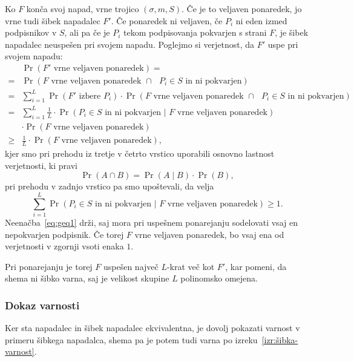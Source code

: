 \begin{dokaz}
    Ko $F$ konča svoj napad, vrne trojico $(\sigma, m, S)$. Če je to veljaven ponaredek, jo vrne tudi
    šibek napadalec $F'$. Če ponaredek ni veljaven, če $P_i$ ni eden izmed podpisnikov v $S$, ali pa
    če je $P_i$ tekom podpisovanja pokvarjen s strani $F$, je šibek napadalec neuspešen pri svojem napadu.
    Poglejmo si verjetnost, da $F'$ uspe pri svojem napadu:
    \begin{align*}
          &\Pr(\text{$F'$ vrne veljaven ponaredek}) = \\
        = &\Pr(\text{$F$ vrne veljaven ponaredek } \cap \text{ $P_i \in S$ in ni pokvarjen}) \\
        = &\sum_{i=1}^L \Pr(\text{$F'$ izbere $P_i$}) \cdot 
            \Pr(\text{$F$ vrne veljaven ponaredek } \cap \text{ $P_i \in S$ in ni pokvarjen}) \\
        = &\sum_{i=1}^L \frac{1}{L} \cdot 
            \Pr(\text{$P_i \in S$ in ni pokvarjen | $F$ vrne veljaven ponaredek}) \\
          &\cdot \Pr(\text{$F$ vrne veljaven ponaredek}) \\
        \geq &\frac{1}{L} \cdot \Pr(\text{$F$ vrne veljaven ponaredek}),
    \end{align*}
    kjer smo pri prehodu iz tretje v četrto vrstico uporabili osnovno lastnost verjetnosti, ki pravi
    $$
    \Pr(A \cap B) = \Pr(A \mid B) \cdot \Pr(B),
    $$
    pri prehodu v zadnjo vrstico pa smo upoštevali, da velja
    \begin{equation}
    \label{eq:geq1}
    \sum_{i=1}^L \Pr(\text{$P_i \in S$ in ni pokvarjen | $F$ vrne veljaven ponaredek}) \geq 1.
    \end{equation}
    Neenačba~\eqref{eq:geq1} drži, saj mora pri uspešnem ponarejanju sodelovati vsaj en nepokvarjen
    podpisnik. Če torej $F$ vrne veljaven ponaredek, bo vsaj ena od verjetnosti v zgornji vsoti enaka $1$.

    Pri ponarejanju je torej $F$ uspešen največ $L$-krat več kot $F'$, kar pomeni, da shema ni šibko
    varna, saj je velikost skupine $L$ polinomsko omejena.
\end{dokaz}

\subsubsection{Dokaz varnosti}
Ker sta napadalec in šibek napadalec ekvivalentna, je dovolj pokazati varnost v primeru šibkega
napadalca, shema pa je potem tudi varna po izreku~\ref{izr:šibka-varnost}.

